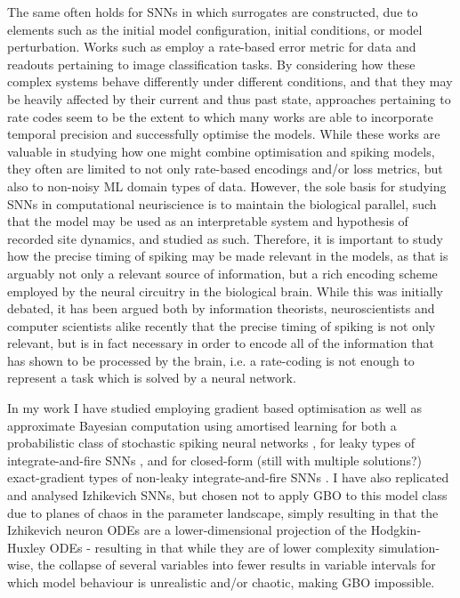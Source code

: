 \documentclass[mphil,deptreport,ai]{infthesis} %
\begin{document}
The same often holds for SNNs in which surrogates are constructed, due to elements such as the initial model configuration, initial conditions, or model perturbation.
Works such as \cite{Jin2018} employ a rate-based error metric for data and readouts pertaining to image classification tasks.
By considering how these complex systems behave differently under different conditions, and that they may be heavily affected by their current and thus past state, approaches pertaining to rate codes seem to be the extent to which many works are able to incorporate temporal precision and successfully optimise the models.
While these works are valuable in studying how one might combine optimisation and spiking models, they often are limited to not only rate-based encodings and/or loss metrics, but also to non-noisy ML domain types of data.
However, the sole basis for studying SNNs in computational neuriscience is to maintain the biological parallel, such that the model may be used as an interpretable system and hypothesis of recorded site dynamics, and studied as such.
Therefore, it is important to study how the precise timing of spiking may be made relevant in the models, as that is arguably not only a relevant source of information, but a rich encoding scheme employed by the neural circuitry in the biological brain.
While this was initially debated, it has been argued both by information theorists, neuroscientists and computer scientists alike recently that the precise timing of spiking is not only relevant, but is in fact necessary in order to encode all of the information that has shown to be processed by the brain, i.e. a rate-coding is not enough to represent a task which is solved by a neural network.

In my work I have studied employing gradient based optimisation as well as approximate Bayesian computation using amortised learning for both a probabilistic class of stochastic spiking neural networks \cite{Rene2020}, for leaky types of integrate-and-fire SNNs \cite{allen_glif_white_paper}, and for closed-form (still with multiple solutions?) exact-gradient types of non-leaky integrate-and-fire SNNs \cite{Huh2017}.
I have also replicated and analysed Izhikevich SNNs, but chosen not to apply GBO to this model class due to planes of chaos in the parameter landscape, simply resulting in that the Izhikevich neuron ODEs are a lower-dimensional projection of the Hodgkin-Huxley ODEs - resulting in that while they are of lower complexity simulation-wise, the collapse of several variables into fewer results in variable intervals for which model behaviour is unrealistic and/or chaotic, making GBO impossible.
\end{document}
